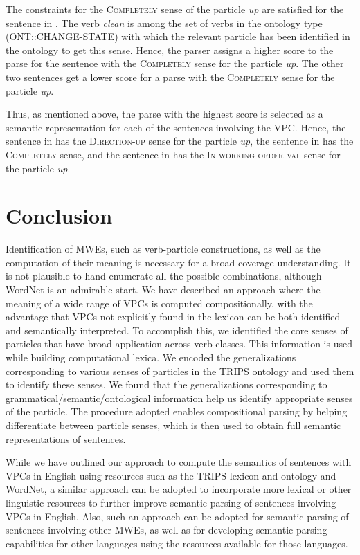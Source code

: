 \documentclass[output=paper
,modfonts
,nonflat]{langsci/langscibook}
\begin{document}
The constraints for the \textsc{Completely} sense of the particle \textit{up} are satisfied for the sentence in . The verb \textit{clean} is among the set of verbs in the ontology type (ONT::CHANGE-STATE) with which the relevant particle has been identified in the ontology to get this sense. Hence, the parser assigns a higher score to the parse for the sentence with the \textsc{Completely} sense for the particle \textit{up}. The other two sentences get a lower score for a parse with the \textsc{Completely} sense for the particle \textit{up}.

Thus, as mentioned above, the parse with the highest score is selected as a semantic representation for each of the sentences involving the VPC. Hence, the sentence in  has the \textsc{Direction-up} sense for the particle \textit{up}, the sentence in  has the \textsc{Completely} sense, and the sentence in  has the \textsc{In-working-order-val} sense for the particle \textit{up}.

\section{Conclusion } \label{bha:sec:conclusions}
Identification of MWEs, such as verb-particle constructions, as well as the computation of their meaning is necessary for a broad coverage understanding. It is not plausible to hand enumerate all the possible combinations, although WordNet is an admirable start.  We have described an approach where the meaning of a wide range of VPCs is computed compositionally, with the advantage that VPCs not explicitly found in the lexicon can be both identified and semantically interpreted. To accomplish this, we identified the core senses of particles that have broad application across verb classes. This information is used while building computational lexica. We encoded the generalizations corresponding to various senses of particles in the TRIPS ontology and used them to identify these senses. We found that the generalizations corresponding to grammatical/semantic/ontological information help us identify appropriate senses of the particle. The procedure adopted enables compositional parsing by helping differentiate between particle senses, which is then used to obtain full semantic representations of sentences.

While we have outlined our approach to compute the semantics of sentences with VPCs in English using resources such as the TRIPS lexicon and ontology and WordNet, a similar approach can be adopted to incorporate more lexical or other linguistic resources to further improve semantic parsing of sentences involving VPCs in English. Also, such an approach can be adopted for semantic parsing of sentences involving other MWEs, as well as for developing semantic parsing capabilities for other languages using the resources available for those languages.  
\end{document}
